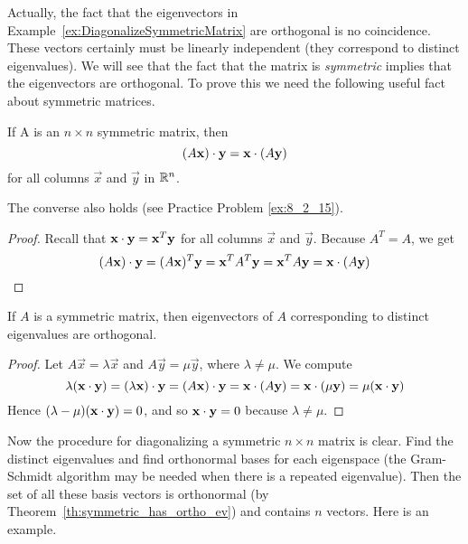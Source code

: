 \documentclass{ximera}
\begin{document}
Actually, the fact that the eigenvectors in Example~\ref{ex:DiagonalizeSymmetricMatrix} are orthogonal is no coincidence. These vectors certainly must be linearly independent (they correspond to distinct eigenvalues).  We will see that the fact that the matrix is \textit{symmetric} implies that the eigenvectors are orthogonal. To prove this we need the following useful fact about symmetric matrices.

\begin{theorem}\label{th:dotpSymmetric}
If A is an $n \times n$ symmetric matrix, then
\begin{equation*}
(A\mathbf{x}) \cdot \mathbf{y} = \mathbf{x} \cdot (A\mathbf{y})
\end{equation*}
for all columns $\vec{x}$ and $\vec{y}$ in $\mathbb{R}^n$.
\end{theorem}
\begin{remark}
The converse also holds (see Practice Problem \ref{ex:8_2_15}).
\end{remark}

\begin{proof}
Recall that $\mathbf{x} \cdot \mathbf{y} = \mathbf{x}^{T} \mathbf{y}$ for all columns $\vec{x}$ and $\vec{y}$. Because $A^{T} = A$, we get
\begin{equation*}
(A\mathbf{x}) \cdot \mathbf{y} = (A\mathbf{x})^T\mathbf{y} = \mathbf{x}^TA^T\mathbf{y} =  \mathbf{x}^TA\mathbf{y} = \mathbf{x} \cdot (A\mathbf{y})
\end{equation*}
\end{proof}

\begin{theorem}\label{th:symmetric_has_ortho_ev}
If $A$ is a symmetric matrix, then eigenvectors of $A$ corresponding to distinct eigenvalues are orthogonal.
\end{theorem}

\begin{proof}
Let $A\vec{x} = \lambda \vec{x}$ and $A\vec{y} = \mu \vec{y}$, where $\lambda \neq \mu$. We compute
\begin{equation*}
\lambda(\mathbf{x} \cdot \mathbf{y}) = (\lambda\mathbf{x}) \cdot \mathbf{y} = (A\mathbf{x}) \cdot \mathbf{y} = \mathbf{x} \cdot (A\mathbf{y}) = \mathbf{x} \cdot (\mu\mathbf{y}) = \mu(\mathbf{x} \cdot \mathbf{y})
\end{equation*}
Hence $(\lambda - \mu)(\mathbf{x} \cdot \mathbf{y}) = 0$, and so $\mathbf{x} \cdot \mathbf{y} = 0$ because $\lambda \neq \mu$.
\end{proof}

Now the procedure for diagonalizing a symmetric $n \times n$ matrix is clear. Find the distinct eigenvalues
 and find orthonormal bases for each eigenspace (the Gram-Schmidt
algorithm may be needed when there is a repeated eigenvalue). Then the set of all these basis vectors is
orthonormal (by Theorem~\ref{th:symmetric_has_ortho_ev}) and contains $n$ vectors. Here is an example.
\end{document}
